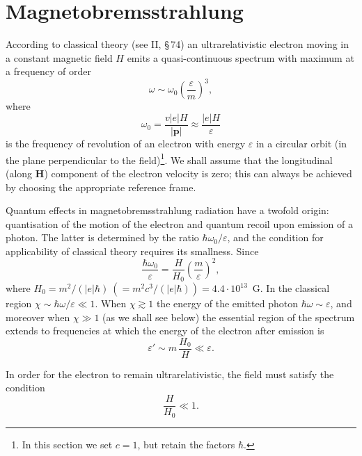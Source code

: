 
\section{Magnetobremsstrahlung}


According to classical theory (see II, \S\,74) an ultrarelativistic electron moving in a constant magnetic field $H$ emits a quasi-continuous spectrum with maximum at a frequency of order
\begin{equation}
\omega \sim \omega_0\left(\frac{\varepsilon}{m}\right)^{\!3},
\label{eq:90.1}
\end{equation}
where
\begin{equation}
\omega_0 = \frac{v|e|H}{|\mathbf{p}|} \approx \frac{|e|H}{\varepsilon}
\label{eq:90.2}
\end{equation}
is the frequency of revolution of an electron with energy $\varepsilon$ in a circular orbit (in the plane perpendicular to the field)\footnote{In this section we set $c = 1$, but retain the factors $\hbar$.}. We shall assume that the longitudinal (along $\mathbf{H}$) component of the electron velocity is zero; this can always be achieved by choosing the appropriate reference frame.

Quantum effects in magnetobremsstrahlung radiation have a twofold origin: quantisation of the motion of the electron and quantum recoil upon emission of a photon. The latter is determined by the ratio $\hbar\omega_0/\varepsilon$, and the condition for applicability of classical theory requires its smallness. Since
\begin{equation}
\frac{\hbar\omega_0}{\varepsilon} = \frac{H}{H_0}\left(\frac{m}{\varepsilon}\right)^{\!2},
\label{eq:90.3}
\end{equation}
where $H_0 = m^2/(|e|\hbar)\ (= m^2c^3/(|e|\hbar)) = 4.4\cdot 10^{13}$~G. In the classical region $\chi \sim \hbar\omega/\varepsilon \ll 1$. When $\chi \gtrsim 1$ the energy of the emitted photon $\hbar\omega \sim \varepsilon$, and moreover when $\chi \gg 1$ (as we shall see below) the essential region of the spectrum extends to frequencies at which the energy of the electron after emission is
\begin{equation}
\varepsilon' \sim m\,\frac{H_0}{H} \ll \varepsilon.
\label{eq:90.4}
\end{equation}


In order for the electron to remain ultrarelativistic, the field must satisfy the condition
\begin{equation}
\frac{H}{H_0} \ll 1.
\label{eq:90.5}
\end{equation}

